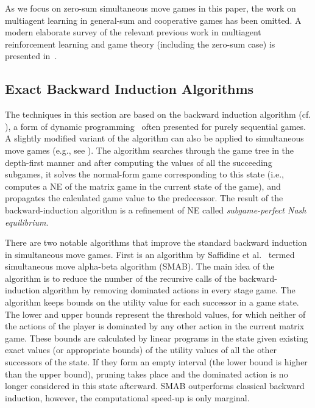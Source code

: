 As we focus on zero-sum simultaneous move games in this paper, the work on multiagent learning in general-sum and 
cooperative games has been omitted. A modern elaborate survey of the relevant previous work in multiagent 
reinforcement learning and game theory (including the zero-sum case) is presented in~\cite{Nowe12MARLchapter}. 

\subsection{Exact Backward Induction Algorithms}

The techniques in this section are based on the backward induction algorithm (cf. \cite{Shoham09}), 
a form of dynamic programming~\cite{Bellman57} often presented for purely sequential games. 
A slightly modified variant of the algorithm can also be applied to simultaneous move 
games (e.g., see \cite{Ross71Goofspiel,buro2003,Rhoads12Computer}). 
The algorithm searches through the game tree in the depth-first manner and after computing the values of all the succeeding subgames, it solves the normal-form game corresponding to this state (i.e., computes a NE of the matrix game in the current state of the game), and propagates the calculated game value to the predecessor. The result of the backward-induction algorithm is a refinement of NE called \emph{subgame-perfect Nash equilibrium}. 

There are two notable algorithms that improve the standard backward induction in simultaneous move games. 
First is an algorithm by Saffidine et al.~\cite{Saffidine12SMAB} termed simultaneous move alpha-beta algorithm (SMAB). 
The main idea of the algorithm is to reduce the number of the recursive calls of the backward-induction algorithm by removing dominated actions in every stage game. The algorithm keeps bounds on the utility value for each successor in a game state. 
The lower and upper bounds represent the threshold values, for which neither of the actions of the player is dominated by any other action in the current matrix game. These bounds are calculated by linear programs in the state given existing exact values (or appropriate bounds) of the utility values of all the other successors of the state. If they form an empty interval (the lower bound is higher than the upper bound), pruning takes place and the dominated action is no longer considered in this state afterward. 
SMAB outperforms classical backward induction, however, the computational speed-up is only marginal. 

